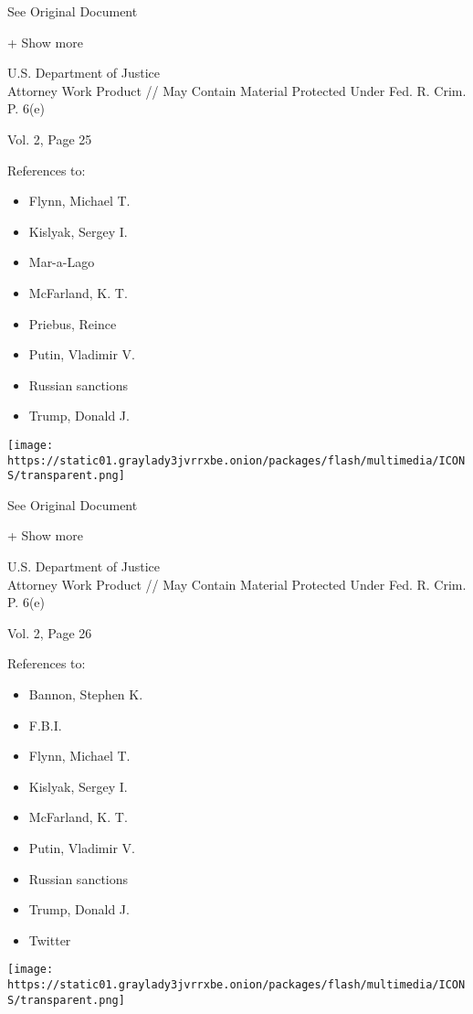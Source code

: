 See Original Document

+ Show more

U.S. Department of Justice\\
Attorney Work Product // May Contain Material Protected Under Fed. R.
Crim. P. 6(e)

Vol. 2, Page 25

References to:

\begin{itemize}
\tightlist
\item
  Flynn, Michael T.
\item
  Kislyak, Sergey I.
\item
  Mar-a-Lago
\item
  McFarland, K. T.
\item
  Priebus, Reince
\item
  Putin, Vladimir V.
\item
  Russian sanctions
\item
  Trump, Donald J.
\end{itemize}

\protect\hyperlink{}{}

\texttt{[image: https://static01.graylady3jvrrxbe.onion/packages/flash/multimedia/ICONS/transparent.png]}

See Original Document

+ Show more

U.S. Department of Justice\\
Attorney Work Product // May Contain Material Protected Under Fed. R.
Crim. P. 6(e)

Vol. 2, Page 26

References to:

\begin{itemize}
\tightlist
\item
  Bannon, Stephen K.
\item
  F.B.I.
\item
  Flynn, Michael T.
\item
  Kislyak, Sergey I.
\item
  McFarland, K. T.
\item
  Putin, Vladimir V.
\item
  Russian sanctions
\item
  Trump, Donald J.
\item
  Twitter
\end{itemize}

\protect\hyperlink{}{}

\texttt{[image: https://static01.graylady3jvrrxbe.onion/packages/flash/multimedia/ICONS/transparent.png]}

